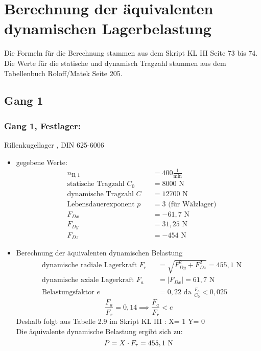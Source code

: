 \section{Berechnung der äquivalenten dynamischen Lagerbelastung}
Die Formeln für die Berechnung stammen aus dem Skript KL III Seite 73 bis 74.
Die Werte für die statische und dynamisch Tragzahl stammen aus dem Tabellenbuch Roloff/Matek  Seite 205.
\subsection{Gang 1}
\subsubsection{Gang 1, Festlager:} Rillenkugellager , DIN 625-6006\\
\begin{itemize}
	\item gegebene Werte:
	\begin{align*}
	&n_{{\mathord{\mathrm{II}},1}} &&=  400 \frac{1}{\text{min}} \\
	&\text{statische Tragzahl } C_{0} &&= 8000 \text{ N}\\
	&\text{dynamische Tragzahl } C &&= 12700 \text{ N} \\
	&\text{Lebensdauerexponent } p &&= 3 \text{ (für Wälzlager)} \\
	&F_{Dx} && = -61,7 \text{ N}\\
	&F_{Dy} && = 31,25 \text{ N}\\
	&F_{Dz} && = -454 \text{ N}
	\end{align*} 
	\item Berechnung der äquivalenten dynamischen Belastung
	\begin{align*}
	&\text{dynamische radiale Lagerkraft } F_r&& = \sqrt{F_{Dy}^2 + F_{Dz}^2 } = 455,1 \text{ N} \\
	&\text{dynamische axiale Lagerkraft } F_a&& = |F_{Dx}| = 61,7 \text{ N}\\
	&\text{Belastungsfaktor } e &&= 0,22 \text{ da } \frac{F_a}{C_0} < 0,025
	\end{align*} 
	\[\frac{F_a}{F_r} = 0,14 \implies \frac{F_a}{F_r} < e\]
	Deshalb folgt aus Tabelle 2.9 im Skript KL III : X= 1 \text{, } Y= 0 \\
	Die äquivalente dynamische Belastung ergibt sich zu: 
	\[
	P= X \cdot F_r = 455,1 \text{ N}
	\]
\end{itemize}

